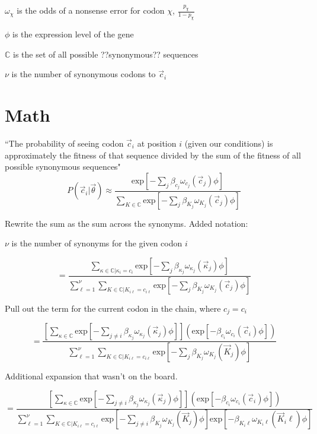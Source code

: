 \documentclass[11pt]{article} %
\begin{document}
$\omega_\chi$ is the odds of a nonsense error for codon $\chi$, $\frac{p_\chi}{1-p_\chi}$ 

$\phi$ is the expression level of the gene

$\mathbb{C}$ is the set of all possible ??synonymous?? sequences

$\nu$ is the number of synonymous codons to $\vec{c}_i$

\section{Math}

``The probability of seeing codon $\vec{c}_i$ at position $i$ (given our conditions) is approximately the fitness of that sequence divided by the sum of the fitness of all possible synonymous sequences"
\[
P(\vec{c}_i | \vec{\theta})
\approx
\frac{
\mbox{exp}\left[-\sum_{j} \beta_{c_j} \omega_{c_j} (\vec{c}_j) \phi \right]
}{
\sum _{K \in \mathbb{C}}
\mbox{exp}\left[-\sum_{j} \beta_{K_j} \omega_{K_j} (\vec{c}_j) \phi \right]
}
\]


Rewrite the sum as the sum across the synonyms.
Added notation: 

$\nu$ is the number of synonyms for the given codon $i$

\[
=
\frac{
\sum _{\kappa \in \mathbb{C} | \kappa_i = c_i}
\mbox{exp}\left[-\sum_{j} \beta_{\kappa_j} \omega_{\kappa_j} (\vec{\kappa}_j) \phi \right]
}{
\sum_{\ell=1}^\nu
\sum _{K \in \mathbb{C} | K_{i\ell} = c_{i\ell}}
\mbox{exp}\left[-\sum_{j} \beta_{K_j} \omega_{K_j} (\vec{c}_j) \phi \right]
}
\]

Pull out the term for the current codon in the chain, where $c_j=c_i$

\[
=
\frac{
\left[
\sum _{\kappa \in \mathbb{C}}
\mbox{exp}\left[-\sum_{j\neq i} \beta_{\kappa_j} \omega_{\kappa_j} (\vec{\kappa}_j) \phi \right]
\right]
\left(\mbox{exp}\left[-\beta_{c_i} \omega_{c_i} (\vec{c}_i) \phi \right]\right)
}{
\sum_{\ell=1}^\nu
\sum _{K \in \mathbb{C} | K_{i\ell} = c_{i\ell}}
\mbox{exp}\left[-\sum_{j} \beta_{K_j} \omega_{K_j} (\vec{K}_j) \phi \right]
}
\]


Additional expansion that wasn't on the board. 

\[
=
\frac{
\left[
\sum _{\kappa \in \mathbb{C}}
\mbox{exp}\left[-\sum_{j\neq i} \beta_{\kappa_j} \omega_{\kappa_j} (\vec{\kappa}_j) \phi \right]
\right]
\left(\mbox{exp}\left[-\beta_{c_i} \omega_{c_i} (\vec{c}_i) \phi \right]\right)
}{
\sum_{\ell=1}^\nu
\sum _{K \in \mathbb{C} | K_{i\ell} = c_{i\ell}}
\mbox{exp}\left[-\sum_{j\neq i} \beta_{K_j} \omega_{K_j} (\vec{K}_j) \phi \right]
\mbox{exp}\left[-\beta_{K_i\ell} \omega_{K_i\ell} (\vec{K}_i\ell) \phi \right]
}
\]
\end{document}
